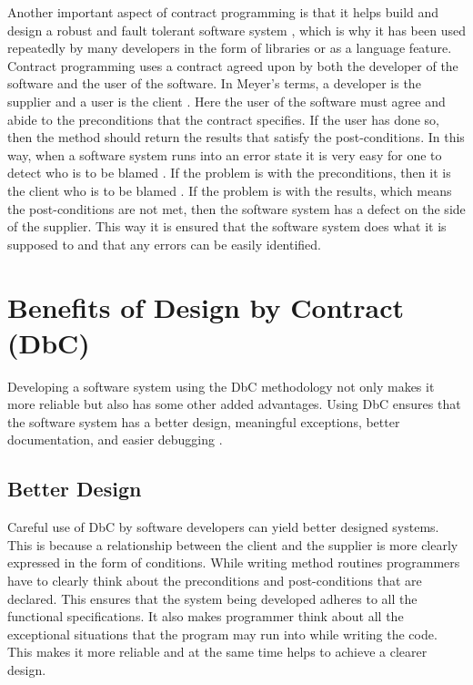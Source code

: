 Another important aspect of contract programming is that it helps build and design a robust and fault tolerant software system \cite{ceballos2005constraint}, which is why it has been used repeatedly by many developers in the form of libraries or as a language feature.
Contract programming uses a contract agreed upon by both the developer of the software and the user of the software. In Meyer's terms, a developer is the supplier and a user is the client \cite{ApplyingDesignByContract}.  
Here the user of the software must agree and abide to the preconditions that the contract specifies. If the user has done so, then the method should return the results that satisfy the post-conditions. In this way, when a software system runs into an error state it is very easy for one to detect who is to be blamed \cite{dimoulas2011correct}. If the problem is with the preconditions, then it is the client who is to be blamed \cite{rajkumar2015designing}. If the problem is with the results, which means the post-conditions are not met, then the software system has a defect on the side of the supplier. This way it is ensured that the software system does what it is supposed to and that any errors can be easily identified.

\section{Benefits of Design by Contract (DbC)}

Developing a software system using the DbC methodology not only makes it more reliable but also has some other added advantages. Using DbC ensures that the software system has a better design, meaningful exceptions, better documentation, and easier debugging \cite{DesignByContractByExample}.

\subsection{Better Design}
Careful use of DbC by software developers can yield better designed systems. This is because a relationship between the client and the supplier is more clearly expressed in the form of conditions. While writing method routines programmers have to clearly think about the preconditions and post-conditions that are declared. This ensures that the system being developed adheres to all the functional specifications. It also makes programmer think about all the exceptional situations that the program may run into while writing the code. This makes it more reliable and at the same time helps to achieve a clearer design.

